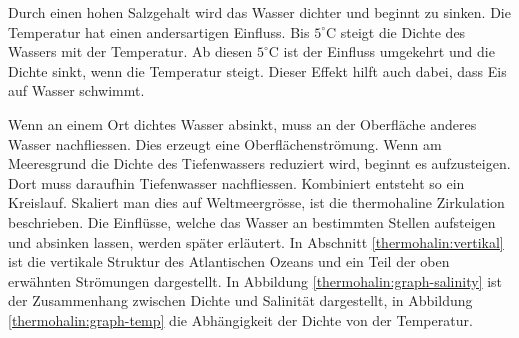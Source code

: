 Durch einen hohen Salzgehalt wird das Wasser dichter und beginnt zu sinken. Die Temperatur hat einen andersartigen Einfluss. Bis $5^\circ\text{C}$ steigt die Dichte des Wassers mit der Temperatur. Ab diesen $5^\circ\text{C}$ ist der Einfluss umgekehrt und die Dichte sinkt, wenn die Temperatur steigt. Dieser Effekt hilft auch dabei, dass Eis auf Wasser schwimmt.

Wenn an einem Ort dichtes Wasser absinkt, muss an der Oberfläche anderes Wasser nachfliessen. Dies erzeugt eine Oberflächenströmung. Wenn am Meeresgrund die Dichte des Tiefenwassers reduziert wird, beginnt es aufzusteigen. Dort muss daraufhin Tiefenwasser nachfliessen. Kombiniert entsteht so ein Kreislauf. Skaliert man dies auf Weltmeergrösse, ist die thermohaline Zirkulation beschrieben. Die Einflüsse, welche das Wasser an bestimmten Stellen aufsteigen und absinken lassen, werden später erläutert. In Abschnitt \ref{thermohalin:vertikal} ist die vertikale Struktur des Atlantischen Ozeans und ein Teil der oben erwähnten Strömungen dargestellt.
In Abbildung \ref{thermohalin:graph-salinity} ist der Zusammenhang zwischen Dichte und Salinität dargestellt, in Abbildung \ref{thermohalin:graph-temp} die Abhängigkeit der Dichte von der Temperatur.

